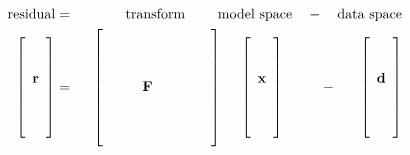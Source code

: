 \begin{eqnarray}
{\rm residual}
&=& \quad\quad
{\rm 
\ \ \hbox{transform} \ \ \  \ \quad \hbox{model space} 
\ \ \ -\ \
\ \hbox{data space}
}
        \\                                                                               
\left[
\begin{array}{c}
\, \\
\, \\
\bold r\\
\, \\
\, \\
\,
\end{array}
\right]
       &=&
       \ \ 
\left[
\begin{array}{cccccc}
\, & \,& \,&     \,& \,& \, \\
\, & \,& \,&     \,& \,& \, \\
\, & \,& \,&     \,& \,& \, \\
\, & \,& \bold F \,& \,& \, \\
\, & \,& \,&     \,& \,& \, \\
\, & \,& \,&     \,& \,& \, \\
\, & \,& \,&     \,& \,& \,
\end{array}
  \right]
 \ \ \ \
\left[
\begin{array}{c}
\, \\
\, \\
\bold x\\
\, \\
\, \\
\,
\end{array}
  \right]
  \ \ \ 
\ \ \ \ \ -\ \ \ \ \ 
\left[
\begin{array}{c}
\, \\
\, \\
\bold d\\
\, \\
\, \\
\,
\end{array}
  \right]
\label{eqn:cg1b}
\end{eqnarray}
